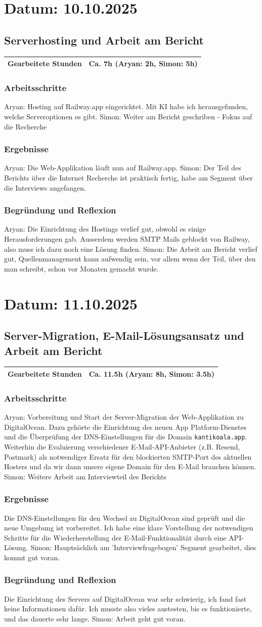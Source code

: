 \documentclass[a4paper,12pt]{article}
\newcommand{\JournalEntry}[6][false]{
    \subsection*{#2}
    \begin{tabular}{|l|l|}
        \hline
        \textbf{Gearbeitete Stunden} & #3 \\ \hline
    \end{tabular}

    \subsubsection*{\textbf{Arbeitsschritte}}
    #4

    \subsubsection*{\textbf{Ergebnisse}}
    #5

    \subsubsection*{\textbf{Begründung und Reflexion}}
    #6

    \vspace{1cm}

    \ifthenelse{\equal{#1}{true}}{
        \hrule
    
    \vspace{1cm}
    }{}
}
\newcommand{\JournalDay}[1]{
    \section*{Datum: #1}
    \vspace{0.3cm}
}
\begin{document}
\JournalDay{10.10.2025}
\JournalEntry[true]{Serverhosting und Arbeit am Bericht}{Ca. 7h (Aryan: 2h, Simon: 5h)}{Aryan: Hosting auf Railway.app eingerichtet. Mit KI habe ich herausgefunden, welche Serveroptionen es gibt. Simon: Weiter am Bericht geschriben - Fokus auf die Recherche}{Aryan: Die Web-Applikation läuft nun auf Railway.app. Simon: Der Teil des Berichts über die Internet Recherche ist praktisch fertig, habe am Segment über die Interviews angefangen.}{Aryan: Die Einrichtung des Hostings verlief gut, obwohl es einige Herausforderungen gab. Ausserdem werden SMTP Mails geblockt von Railway, also muss ich dazu noch eine Lösung finden. Simon: Die Arbeit am Bericht verlief gut, Quellenmanagement kann aufwendig sein, vor allem wenn der Teil, über den man schreibt, schon vor Monaten gemacht wurde.}

\JournalDay{11.10.2025}
\JournalEntry[true]{Server-Migration, E-Mail-Lösungsansatz und Arbeit am Bericht}{Ca. 11.5h (Aryan: 8h, Simon: 3.5h)}{Aryan: Vorbereitung und Start der Server-Migration der Web-Applikation zu DigitalOcean. Dazu gehörte die Einrichtung des neuen App Platform-Dienstes und die Überprüfung der DNS-Einstellungen für die Domain \texttt{kantikoala.app}. Weiterhin die Evaluierung verschiedener E-Mail-API-Anbieter (z.B. Resend, Postmark) als notwendiger Ersatz für den blockierten SMTP-Port des aktuellen Hosters und da wir dann unsere eigene Domain für den E-Mail brauchen können. Simon: Weitere Arbeit am Interviewteil des Berichts}{Die DNS-Einstellungen für den Wechsel zu DigitalOcean sind geprüft und die neue Umgebung ist vorbereitet. Ich habe eine klare Vorstellung der notwendigen Schritte für die Wiederherstellung der E-Mail-Funktionalität durch eine API-Lösung. Simon: Hauptsächlich am 'Interviewfragebogen' Segment gearbeitet, dies kommt gut voran.}{Die Einrichtung des Servers auf DigitalOcean war sehr schwierig, ich fand fast keine Informationen dafür. Ich musste also vieles austesten, bis es funktionierte, und das dauerte sehr lange. Simon: Arbeit geht gut voran.}
\end{document}
